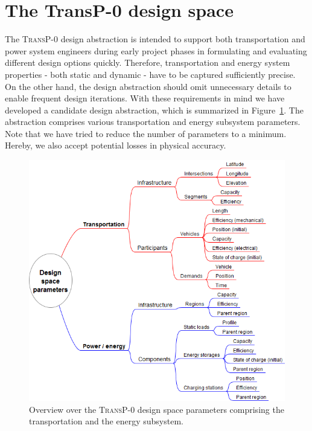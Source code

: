 \section{The \textbf{TransP-0} design space}
\label{proposed_model}

The \textsc{TransP-0} design abstraction is intended to support both transportation and power system engineers during early project phases in formulating and evaluating different design options quickly. Therefore, transportation and energy system properties - both static and dynamic - have to be captured sufficiently precise. On the other hand, the design abstraction should omit unnecessary details to enable frequent design iterations. With these requirements in mind we have developed a candidate design abstraction, which is summarized in Figure~\ref{system_design}. The abstraction comprises various transportation and energy subsystem parameters. Note that we have tried to reduce the number of parameters to a minimum. Hereby, we also accept potential losses in physical accuracy.

\begin{figure}[h!]
	\includegraphics[width=\columnwidth]{./gfx/system_design.png}
	\caption{Overview over the \textsc{TransP-0} design space parameters comprising the transportation and the energy subsystem.}
	\label{system_design}
\end{figure}

